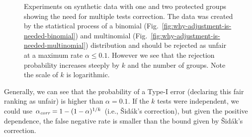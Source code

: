 \begin{figure}[h]
	\centering
	\hfill
	\hfill
	\caption{Experiments on synthetic data with one and two protected groups showing the need for multiple tests correction.
		The data was created by the statistical process of a binomial (Fig.~\ref{fig:why-adjustment-is-needed-binomial}) and multinomial (Fig.~\ref{fig:why-adjustment-is-needed-multinomial}) distribution and should be rejected as unfair at a maximum rate $\alpha \leq 0.1$.
		However we see that the rejection probability increases steeply by $k$ and the number of groups.
		Note the scale of $k$ is logarithmic.}
	\label{fig:need-for-model-adjustment}
\end{figure}

Generally, we can see that the probability of a Type-I error (declaring this fair ranking as unfair) is higher than $\alpha = 0.1$.
%
If the $k$ tests were independent, we could use $\alpha_\textit{corr} = 1 - (1 - \alpha)^{1/k}$ (i.e., {\v S}id{\'a}k's correction), but given the positive dependence, the false negative rate is smaller than the bound given by {\v S}id{\'a}k's correction.

